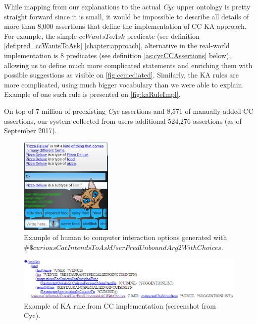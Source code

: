While mapping from our explanations to the actual \emph{Cyc} upper ontology is 
pretty straight forward since it is small, it would be impossible to describe
all details of more than 8,000 assertions that define the implementation of
CC KA approach. For example, the simple $ccWantsToAsk$ predicate (see
definition \ref{def:pred_ccWantsToAsk} \autoref{chapter:approach}, alternative 
in the real-world implementation
is 8 predicates (see definition \ref{as:cycCCAssertions} below), allowing us to
define much more complicated statements and
enriching them with possible suggestions as visible on \autoref{fig:ccmediated}.
Similarly, the KA rules are more complicated, using much bigger vocabulary
than we were able to explain. Example of one such rule is presented on
\autoref{fig:kaRuleImpl}.

On top of 7 million of preexisting \emph{Cyc} assertions and 8,571 of manually
added CC assertions, our system collected from users additional 524,276 
assertions (as of September 2017).

\begin{figure}[h]
	\centering
		\includegraphics[width=0.4\textwidth]{figures/androidMediated.png}
	\caption{Example of human to computer interaction options generated with
$\#\$curiousCatIntendsToAskUserPredUnboundArg2WithChoices$.}
	\label{fig:ccmediated}
\end{figure}

\begin{figure}[h]
	\centering
		\includegraphics[width=1\textwidth]{figures/kaRule.png}
	\caption{Example of KA rule from CC implementation (screenshot from Cyc).}
	\label{fig:kaRuleImpl}
\end{figure}

